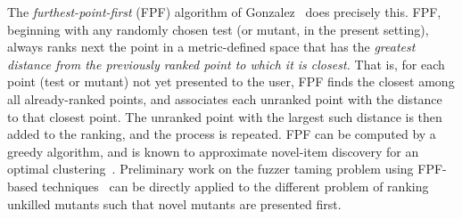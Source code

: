 The \emph{furthest-point-first} (FPF) algorithm of
Gonzalez~\cite{Gonzalez85} does precisely this.  FPF, beginning with
any randomly chosen test (or mutant, in the present setting), always ranks
next the point in a metric-defined space that has the \emph{greatest
  distance from the previously ranked point to which it is closest.}
That is, for each point (test or mutant) not yet presented to the
user, FPF finds the closest among all already-ranked points, and
associates each unranked point with the distance to that closest
point.  The unranked point with the largest such distance is then
added to the ranking, and the process is repeated.  FPF can be
computed by a greedy algorithm, and is known to approximate novel-item
discovery for an optimal clustering~\cite{Gonzalez85}.  Preliminary work on the fuzzer taming problem using FPF-based
techniques~\cite{PLDI13,distMut} can be directly applied
to the different problem of ranking
unkilled mutants such that novel mutants are presented first.  %

